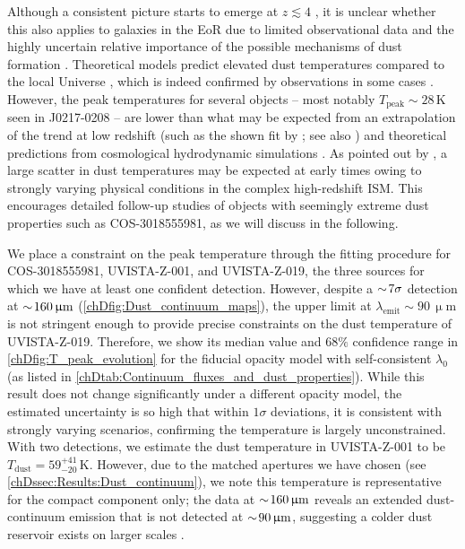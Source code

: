 Although a consistent picture starts to emerge at $z \lesssim 4$ \citep[e.g.][]{2018A&A...609A..30S, 2022ApJ...930..142D}, it is unclear whether this also applies to galaxies in the EoR due to limited observational data and the highly uncertain relative importance of the possible mechanisms of dust formation \citep{2015MNRAS.451L..70M}. Theoretical models predict elevated dust temperatures compared to the local Universe \citep[e.g.][]{2019MNRAS.487.1844M, 2020MNRAS.497..956S, 2022MNRAS.511.4999V}, which is indeed confirmed by observations in some cases \citep[with extreme examples given in][]{2018MNRAS.477..552B, 2020MNRAS.493.4294B, 2022MNRAS.tmpL..72V}. However, the peak temperatures for several objects -- most notably $T_\text{peak} \sim 28 \, \mathrm{K}$ seen in J0217-0208 \citep{2020ApJ...896...93H} -- are lower than what may be expected from an extrapolation of the trend at low redshift (such as the shown fit by \citealt{2018A&A...609A..30S}; see also \citealt{2020ApJ...902..112B}) and theoretical predictions from cosmological hydrodynamic simulations \citep[e.g.][]{2019MNRAS.489.1397L, 2022MNRAS.511.4999V}. As pointed out by \citet{2022MNRAS.513.3122S}, a large scatter in dust temperatures may be expected at early times owing to strongly varying physical conditions in the complex high-redshift ISM. This encourages detailed follow-up studies of objects with seemingly extreme dust properties such as COS-3018555981, as we will discuss in the following.

We place a constraint on the peak temperature through the  fitting procedure for COS-3018555981, UVISTA-Z-001, and UVISTA-Z-019, the three sources for which we have at least one confident detection. However, despite a $\sim \! 7 \sigma$ detection at $\sim \! 160 \, \mathrm{\upmu m}$ (\cref{chDfig:Dust_continuum_maps}), the upper limit at $\lambda_\text{emit} \sim 90 \, \mathrm{\upmu m}$ is not stringent enough to provide precise constraints on the dust temperature of UVISTA-Z-019. Therefore, we show its median value and $68 \%$ confidence range in \cref{chDfig:T_peak_evolution} for the fiducial opacity model with self-consistent $\lambda_0$ (as listed in \cref{chDtab:Continuum_fluxes_and_dust_properties}). While this result does not change significantly under a different opacity model, the estimated uncertainty is so high that within $1 \sigma$ deviations, it is consistent with strongly varying scenarios, confirming the temperature is largely unconstrained. With two detections, we estimate the dust temperature in UVISTA-Z-001 to be $T_\text{dust} = 59_{-20}^{+41} \, \mathrm{K}$. However, due to the matched apertures we have chosen (see \cref{chDssec:Results:Dust_continuum}), we note this temperature is representative for the compact component only; the data at $\sim \! 160 \, \mathrm{\upmu m}$ reveals an extended dust-continuum emission that is not detected at $\sim \! 90 \, \mathrm{\upmu m}$, suggesting a colder dust reservoir exists on larger scales \citep[see also][]{2022ApJ...934...64A}.

